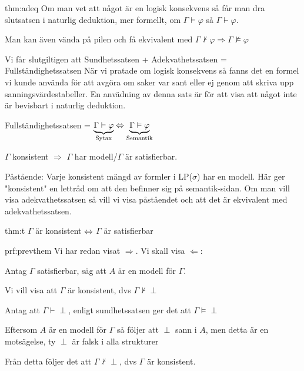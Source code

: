 \begin{theo}[Adekvathetssatsen]{thm:adeq}
  Om man vet att något är en logisk konsekvens så får man dra slutsatsen i naturlig deduktion, mer formellt, om $\Gamma\vDash\varphi$ så $\Gamma\vdash\varphi$. 
  \par\bigskip
  \noindent Man kan även vända på pilen och få ekvivalent med $\Gamma\nvdash\varphi\Rightarrow\Gamma\nvDash\varphi$
\end{theo}
\par\bigskip
\noindent Vi får slutgiltigen att Sundhetssatsen + Adekvathetssatsen = Fullständighetssatsen När vi pratade om logisk konsekvens så fanns det en formel vi       kunde använda för att avgöra om saker var sant eller ej genom att skriva       upp sanningsvärdestabeller. En anvädning av denna sats är för att visa       att något inte är bevisbart i naturlig deduktion.
\par\bigskip
\noindent Fullständighetssatsen = $\underbrace{\Gamma\vdash\varphi}_{\text{Sytax}}\Leftrightarrow \underbrace{\Gamma\vDash\varphi}_{\text{Semantik}}$
\par\bigskip
\noindent $\Gamma$ konsistent $\Rightarrow$ $\Gamma$ har modell/$\Gamma$ är satisfierbar.
\par\bigskip
\noindent Påstående: Varje konsistent mängd av formler i LP($\sigma$) har en modell. Här ger "konsistent" en lettråd om att den befinner sig på semantik-sidan. Om man vill visa adekvathetssatsen så vill vi visa påståendet och att det är ekvivalent med adekvathetssatsen.
\par\bigskip
\begin{theo}[]{thm:t}
  $\Gamma$ är konsistent $\Leftrightarrow$ $\Gamma$ är satisfierbar
\end{theo}
\par\bigskip
\begin{prf}{prf:prevthem}
  Vi har redan visat $\Rightarrow$. Vi skall visa $\Leftarrow$:\par
  \noindent Antag $\Gamma$ satisfierbar, säg att $A$ är en modell för $\Gamma$.\par
  \noindent Vi vill visa att $\Gamma$ är konsistent, dvs $\Gamma\nvdash\perp$\par
  \noindent Antag att $\Gamma\vdash\perp$, enligt sundhetssatsen ger det att $\Gamma\vDash\perp$\par
  \noindent Eftersom $A$ är en modell för $\Gamma$ så följer att $\perp$ sann i $A$, men detta är en motsägelse, ty $\perp$ är falsk i alla strukturer\par
  \noindent Från detta följer det att $\Gamma\nvdash\perp$, dvs $\Gamma$ är konsistent.
\end{prf}
